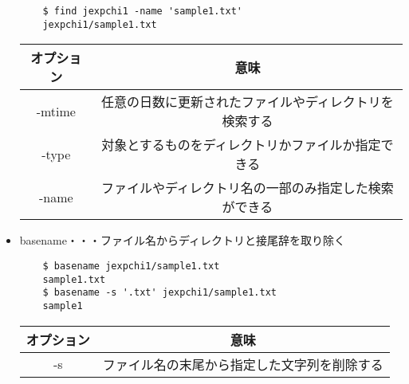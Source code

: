 \documentclass[a4paper,12pt]{jarticle}
\begin{document}
\begin{itemize}
\begin{lstlisting}
    $ find jexpchi1 -name 'sample1.txt'
    jexpchi1/sample1.txt
                           \end{lstlisting}
          \begin{table}[h]
              \begin{center}
                  \begin{tabular}{|c|c|}
                      \hline
                      オプション & 意味                                                   \\ \hline
                      -mtime     & 任意の日数に更新されたファイルやディレクトリを検索する \\      \hline
                      -type      & 対象とするものをディレクトリかファイルか指定できる     \\      \hline
                      -name      & ファイルやディレクトリ名の一部のみ指定した検索ができる \\      \hline
                  \end{tabular}
              \end{center}
          \end{table}
          \clearpage
    \item basename・・・ファイル名からディレクトリと接尾辞を取り除く
          \begin{lstlisting}
    $ basename jexpchi1/sample1.txt
    sample1.txt
    $ basename -s '.txt' jexpchi1/sample1.txt
    sample1
                               \end{lstlisting}
          \begin{table}[h]
              \begin{center}
                  \begin{tabular}{|c|c|}
                      \hline
                      オプション & 意味                                         \\ \hline
                      -s         & ファイル名の末尾から指定した文字列を削除する \\      \hline
                  \end{tabular}
              \end{center}
          \end{table}


\end{itemize}
\end{document}
